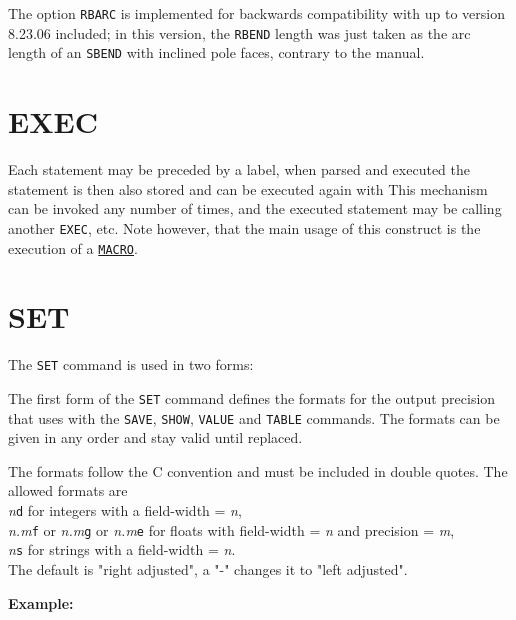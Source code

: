 The option \texttt{RBARC} is implemented for backwards compatibility
with \madeight up to version 8.23.06 included; in this version, the
\texttt{RBEND} length was just taken as the arc length of an
\texttt{SBEND} with inclined pole faces, contrary to the \madeight manual.  



\section{EXEC}
\label{sec:exec}
Each statement may be preceded by a label, when parsed and executed the
statement is then also stored and can be executed again with
This mechanism can be invoked any number of times, and the executed
statement may be calling another \texttt{EXEC}, etc. 
Note however, that the main usage of this \madx construct is the
execution of a \hyperref[sec:macro]{\texttt{MACRO}}.   

\section{SET}
\label{sec:set}
The \texttt{SET} command is used in two forms:


The first form of the \texttt{SET} command defines the formats for the
output precision that \madx uses with the \texttt{SAVE}, \texttt{SHOW},
\texttt{VALUE} and \texttt{TABLE} commands. The formats can be
given in any order and stay valid until replaced. 

The formats follow the C convention and must be included in double
quotes. The allowed formats are \\
\textit{n}\texttt{d} for integers with a field-width = \textit{n}, \\
\textit{n.m}\texttt{f} or \textit{n.m}\texttt{g} or
\textit{n.m}\texttt{e} for floats with field-width = \textit{n}
and precision = \textit{m}, \\
\textit{n}\texttt{s} for strings with a field-width = \textit{n}.\\
The default is "right adjusted", a "-" changes it to "left adjusted".

\textbf{Example:}\\


